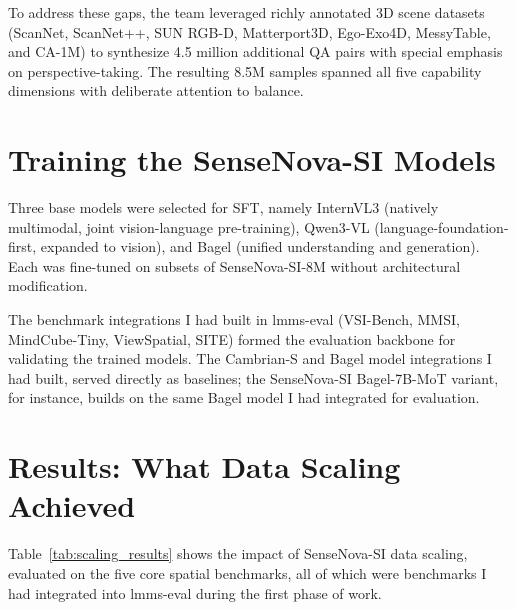 To address these gaps, the team leveraged richly annotated 3D scene datasets (ScanNet, ScanNet++, SUN RGB-D, Matterport3D, Ego-Exo4D, MessyTable, and CA-1M) to synthesize 4.5 million additional QA pairs with special emphasis on perspective-taking. The resulting 8.5M samples spanned all five capability dimensions with deliberate attention to balance.

\section{Training the SenseNova-SI Models}

Three base models were selected for SFT, namely InternVL3 (natively multimodal, joint vision-language pre-training), Qwen3-VL (language-foundation-first, expanded to vision), and Bagel (unified understanding and generation). Each was fine-tuned on subsets of SenseNova-SI-8M without architectural modification.

The benchmark integrations I had built in lmms-eval (VSI-Bench, MMSI, MindCube-Tiny, ViewSpatial, SITE) formed the evaluation backbone for validating the trained models. The Cambrian-S and Bagel model integrations I had built, served directly as baselines; the SenseNova-SI Bagel-7B-MoT variant, for instance, builds on the same Bagel model I had integrated for evaluation.

\section{Results: What Data Scaling Achieved}

Table~\ref{tab:scaling_results} shows the impact of SenseNova-SI data scaling, evaluated on the five core spatial benchmarks, all of which were benchmarks I had integrated into lmms-eval during the first phase of work.

